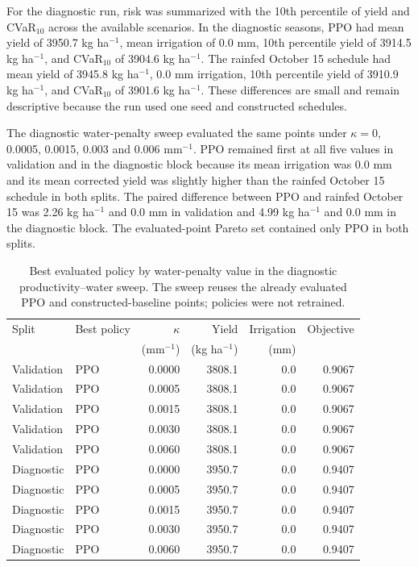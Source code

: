 \documentclass[times,final,authoryear]{elsarticle}
\begin{document}
For the diagnostic run, risk was summarized with the 10th percentile of yield and CVaR$_{10}$ across the available scenarios. In the diagnostic seasons, PPO had mean yield of 3950.7 kg ha$^{-1}$, mean irrigation of 0.0 mm, 10th percentile yield of 3914.5 kg ha$^{-1}$, and CVaR$_{10}$ of 3904.6 kg ha$^{-1}$. The rainfed October 15 schedule had mean yield of 3945.8 kg ha$^{-1}$, 0.0 mm irrigation, 10th percentile yield of 3910.9 kg ha$^{-1}$, and CVaR$_{10}$ of 3901.6 kg ha$^{-1}$. These differences are small and remain descriptive because the run used one seed and constructed schedules.

The diagnostic water-penalty sweep evaluated the same points under $\kappa = 0$, 0.0005, 0.0015, 0.003 and 0.006 mm$^{-1}$. PPO remained first at all five values in validation and in the diagnostic block because its mean irrigation was 0.0 mm and its mean corrected yield was slightly higher than the rainfed October 15 schedule in both splits. The paired difference between PPO and rainfed October 15 was 2.26 kg ha$^{-1}$ and 0.0 mm in validation and 4.99 kg ha$^{-1}$ and 0.0 mm in the diagnostic block. The evaluated-point Pareto set contained only PPO in both splits.

\begin{table}[!h]
\centering
\scriptsize
\caption{Best evaluated policy by water-penalty value in the diagnostic productivity--water sweep. The sweep reuses the already evaluated PPO and constructed-baseline points; policies were not retrained.}
\label{tab_water_frontier_kappa}
\begin{tabular}{llrrrr}
\hline
Split & Best policy & $\kappa$ & Yield & Irrigation & Objective \\
      &             & (mm$^{-1}$) & (kg ha$^{-1}$) & (mm) & \\
\hline
Validation & PPO & 0.0000 & 3808.1 & 0.0 & 0.9067 \\
Validation & PPO & 0.0005 & 3808.1 & 0.0 & 0.9067 \\
Validation & PPO & 0.0015 & 3808.1 & 0.0 & 0.9067 \\
Validation & PPO & 0.0030 & 3808.1 & 0.0 & 0.9067 \\
Validation & PPO & 0.0060 & 3808.1 & 0.0 & 0.9067 \\
Diagnostic & PPO & 0.0000 & 3950.7 & 0.0 & 0.9407 \\
Diagnostic & PPO & 0.0005 & 3950.7 & 0.0 & 0.9407 \\
Diagnostic & PPO & 0.0015 & 3950.7 & 0.0 & 0.9407 \\
Diagnostic & PPO & 0.0030 & 3950.7 & 0.0 & 0.9407 \\
Diagnostic & PPO & 0.0060 & 3950.7 & 0.0 & 0.9407 \\
\hline
\end{tabular}
\end{table}
\end{document}
